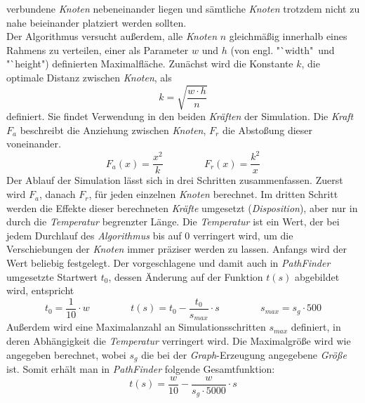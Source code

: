 \documentclass[12pt]{article}
\begin{document}
verbundene \textit{Knoten} nebeneinander liegen und sämtliche \textit{Knoten} trotzdem nicht zu nahe beieinander platziert werden sollten.
\\
Der Algorithmus versucht außerdem, alle \textit{Knoten} $n$ gleichmäßig innerhalb eines Rahmens zu verteilen, einer als Parameter $w$ und $h$ (von engl. "`width"\ und "`height") definierten Maximalfläche. Zunächst wird die Konstante $k$, die optimale Distanz zwischen \textit{Knoten}, als
\[
k = \sqrt{\dfrac{w \cdot h}{n}} 
\]
definiert. Sie findet Verwendung in den beiden \textit{Kräften} der Simulation. Die \textit{Kraft} $F_a$ beschreibt die Anziehung zwischen \textit{Knoten}, $F_r$ die Abstoßung dieser voneinander.
\[
 F_a(x) = \dfrac{x^2}{k} \hspace{50pt} F_r(x) = \dfrac{k^2}{x}
\]
Der Ablauf der Simulation lässt sich in drei Schritten zusammenfassen. Zuerst wird $F_a$, danach $F_r$, für jeden einzelnen \textit{Knoten} berechnet. Im dritten Schritt werden die Effekte dieser berechneten \textit{Kräfte} umgesetzt (\textit{Disposition}), aber nur in durch die \textit{Temperatur} begrenzter Länge. Die \textit{Temperatur} ist ein Wert, der bei jedem Durchlauf des \textit{Algorithmus} bis auf $0$ verringert wird, um die Verschiebungen der \textit{Knoten} immer präziser werden zu lassen. Anfangs wird der Wert beliebig festgelegt. Der vorgeschlagene und damit auch in \textit{PathFinder} umgesetzte Startwert $t_0$, dessen Änderung auf der Funktion  $t(s)$ abgebildet wird, entspricht
\[
t_0 = \dfrac{1}{10} \cdot w \hspace{50pt} t(s) = t_0 - \dfrac{t_0}{s_{max}} \cdot s \hspace{50pt} s_{max} = s_g \cdot 500
\]
Außerdem wird eine Maximalanzahl an Simulationsschritten $s_{max}$  definiert, in deren Abhängigkeit die \textit{Temperatur} verringert wird. Die Maximalgröße wird wie angegeben berechnet, wobei $s_g$ die bei der \textit{Graph}-Erzeugung angegebene \textit{Größe} ist. Somit erhält man in \textit{PathFinder} folgende Gesamtfunktion: 
\[
t(s) = \dfrac{w}{10} - \dfrac{w}{s_g \cdot 5000} \cdot s
\]
\end{document}
